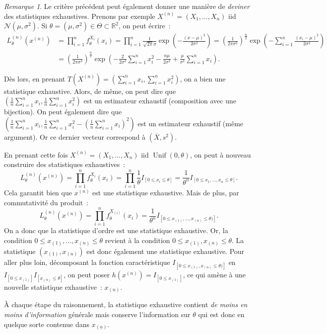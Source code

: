 \documentclass{report}
\DeclareMathOperator{\Unif}{Unif}  %
\newcommand{\Nms}{\mathcal N(\mu, \sigma^2)}
\newcommand{\R}{\mathbb R}
\newcommand{\charfun}[1]{I_{\left[#1\right]}}
\theoremstyle{definition}
\theoremstyle{remark}
\newtheorem*{rmq}{Remarque}
\begin{document}
		\begin{rmq} Le critère précédent peut également donner une manière de \textit{deviner} des statistiques exhaustives. Prenons par exemple
		$X^{(n)} = (X_1, \ldots, X_n)$ iid $\Nms$. Si $\theta = (\mu, \sigma^2) \in \Theta \subset \R^2$, on peut écrire~:
		\begin{align*}
			L_\theta^{(n)}(x^{(n)}) &= \prod_{i=1}^nf^{X_i}_\theta(x_i) = \prod_{i=1}^n\frac 1{\sqrt {2\pi}\sigma}\exp\left(-\frac {(x-\mu)^2}{2\sigma^2}\right)
				= \left(\frac 1{2\pi\sigma^2}\right)^{\frac n2}\exp\left(-\sum_{i=1}^n\frac {(x_i-\mu)^2}{2\sigma^2}\right) \\
			&= \left(\frac 1{2\pi\sigma^2}\right)^{\frac n2}\exp\left(-\frac 2{2\sigma^2}\sum_{i=1}^nx_i^2 - \frac {n\mu}{2\sigma^2} + \frac \mu{\sigma^2}\sum_{i=1}^nx_i\right).
		\end{align*}
		
		Dès lors, en prenant $T(X^{(n)}) = \left(\sum_{i=1}^nx_i, \sum_{i=1}^nx_i^2\right)$, on a bien une statistique exhaustive. Alors, de même, on peut dire que
		$\left(\frac 1n\sum_{i=1}^nx_i, \frac 1n\sum_{i=1}^nx_i^2\right)$ est un estimateur exhaustif (composition avec une bijection). On peut également dire que
		$\left(\frac 1n\sum_{i=1}^nx_i, \frac 1n\sum_{i=1}^nx_i^2 - \left(\frac 1n\sum_{i=1}^nx_i\right)^2\right)$ est un estimateur exhaustif (même argument). Or
		ce dernier vecteur correspond à $(\overline X, s^2)$.
		
		En prenant cette fois $X^{(n)} = (X_1, \ldots, X_n)$ iid $\Unif(0, \theta)$, on peut à nouveau construire des statistiques exhaustives~:
		\[L_\theta^{(n)}(x^{(n)}) = \prod_{i=1}^nf^{X_i}_\theta(x_i) = \prod_{i=1}^n\frac 1\theta\charfun{0 \leq x_i \leq \theta}
			= \frac 1{\theta^n}\charfun{0 \leq x_1, \ldots, x_n \leq \theta}.\]
		Cela garantit bien que $x^{(n)}$ est une statistique exhaustive. Mais de plus, par commutativité du produit~:
		\[L_\theta^{(n)}(x^{(n)}) = \prod_{i=1}^nf^{X_{(i)}}_\theta(x_i) = \frac 1{\theta^n}\charfun{0 \leq x_{(1)}, \ldots, x_{(n)} \leq \theta)}.\]
		On a donc que la statistique d'ordre est une statistique exhaustive. Or, la condition $0 \leq x_{(1)}, \ldots, x_{(n)} \leq \theta$ revient à la condition
		$0 \leq x_{(1)}, x_{(n)} \leq \theta$. La statistique $(x_{(1)}, x_{(n)})$ est donc également une statistique exhaustive. Pour aller plus loin, décomposant
		la fonction caractéristique $\charfun {0 \leq x_{(1)}, x_{(n)} \leq \theta)}$ en $\charfun {0 \leq x_{(1)}}\charfun{x_{(n)} \leq \theta}$, on peut poser
		$h(x^{(n)}) = \charfun{0 \leq x_{(1)}}$, ce qui amène à une nouvelle statistique exhaustive~: $x_{(n)}$.
		
		À chaque étape du raisonnement, la statistique exhaustive contient \textit{de moins en moins d'information} générale mais conserve l'information sur $\theta$
		qui est donc en quelque sorte contenue dans $x_{(n)}$.
		\end{rmq}
		
\end{document}
